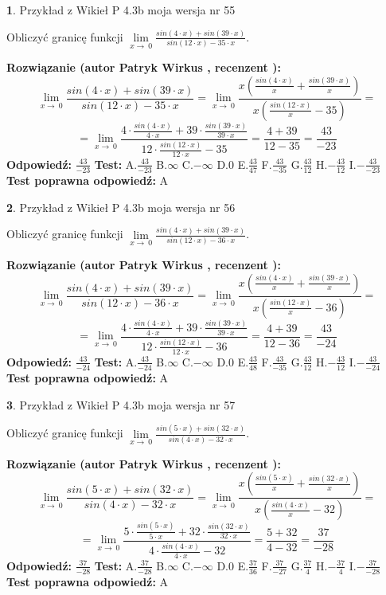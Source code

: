 \documentclass[12pt, a4paper]{article}
\theoremstyle{definition} %
\newtheorem{zad}{}
\newcommand{\zadStart}[1]{\begin{zad}#1\newline}
\newcommand{\zadStop}{\end{zad}}
\newcommand{\rozwStart}[2]{\noindent \textbf{Rozwiązanie (autor #1 , recenzent #2): }\newline}
\newcommand{\rozwStop}{\newline}
\newcommand{\odpStart}{\noindent \textbf{Odpowiedź:}\newline}
\newcommand{\odpStop}{\newline}
\newcommand{\testStart}{\noindent \textbf{Test:}\newline}
\newcommand{\testStop}{\newline}
\newcommand{\kluczStart}{\noindent \textbf{Test poprawna odpowiedź:}\newline}
\newcommand{\kluczStop}{\newline}
\begin{document}
\zadStart{Przykład z Wikieł P 4.3b moja wersja nr 55}


Obliczyć granicę funkcji $\lim\limits_{x\to\ 0}\frac{sin(4 \cdot x)+sin(39 \cdot x)}{sin(12 \cdot x)-35 \cdot x}$.
\zadStop
\rozwStart{Patryk Wirkus}{}
$$\lim\limits_{x\to\ 0}\frac{sin(4 \cdot x)+sin(39 \cdot x)}{sin(12 \cdot x)-35 \cdot x}=\lim\limits_{x\to\ 0}\frac{x(\frac{sin(4 \cdot x)}{x}+\frac{sin(39 \cdot x)}{x})}{x(\frac{sin(12 \cdot x)}{x}-35)}=$$
$$=\lim\limits_{x\to\ 0}\frac{4 \cdot \frac{sin(4 \cdot x)}{4 \cdot x}+39 \cdot \frac{sin(39 \cdot x)}{39 \cdot x}}{12 \cdot \frac{sin(12 \cdot x)}{12 \cdot x}-35}=\frac{4+39}{12-35} = \frac{43}{-23}$$
\rozwStop
\odpStart
$\frac{43}{-23}$
\odpStop
\testStart
A.$\frac{43}{-23}$
B.$\infty$
C.$-\infty$
D.$0$
E.$\frac{43}{47}$
F.$\frac{43}{-35}$
G.$\frac{43}{12}$
H.$-\frac{43}{12}$
I.$-\frac{43}{-23}$
\testStop
\kluczStart
A
\kluczStop



\zadStart{Przykład z Wikieł P 4.3b moja wersja nr 56}


Obliczyć granicę funkcji $\lim\limits_{x\to\ 0}\frac{sin(4 \cdot x)+sin(39 \cdot x)}{sin(12 \cdot x)-36 \cdot x}$.
\zadStop
\rozwStart{Patryk Wirkus}{}
$$\lim\limits_{x\to\ 0}\frac{sin(4 \cdot x)+sin(39 \cdot x)}{sin(12 \cdot x)-36 \cdot x}=\lim\limits_{x\to\ 0}\frac{x(\frac{sin(4 \cdot x)}{x}+\frac{sin(39 \cdot x)}{x})}{x(\frac{sin(12 \cdot x)}{x}-36)}=$$
$$=\lim\limits_{x\to\ 0}\frac{4 \cdot \frac{sin(4 \cdot x)}{4 \cdot x}+39 \cdot \frac{sin(39 \cdot x)}{39 \cdot x}}{12 \cdot \frac{sin(12 \cdot x)}{12 \cdot x}-36}=\frac{4+39}{12-36} = \frac{43}{-24}$$
\rozwStop
\odpStart
$\frac{43}{-24}$
\odpStop
\testStart
A.$\frac{43}{-24}$
B.$\infty$
C.$-\infty$
D.$0$
E.$\frac{43}{48}$
F.$\frac{43}{-35}$
G.$\frac{43}{12}$
H.$-\frac{43}{12}$
I.$-\frac{43}{-24}$
\testStop
\kluczStart
A
\kluczStop



\zadStart{Przykład z Wikieł P 4.3b moja wersja nr 57}


Obliczyć granicę funkcji $\lim\limits_{x\to\ 0}\frac{sin(5 \cdot x)+sin(32 \cdot x)}{sin(4 \cdot x)-32 \cdot x}$.
\zadStop
\rozwStart{Patryk Wirkus}{}
$$\lim\limits_{x\to\ 0}\frac{sin(5 \cdot x)+sin(32 \cdot x)}{sin(4 \cdot x)-32 \cdot x}=\lim\limits_{x\to\ 0}\frac{x(\frac{sin(5 \cdot x)}{x}+\frac{sin(32 \cdot x)}{x})}{x(\frac{sin(4 \cdot x)}{x}-32)}=$$
$$=\lim\limits_{x\to\ 0}\frac{5 \cdot \frac{sin(5 \cdot x)}{5 \cdot x}+32 \cdot \frac{sin(32 \cdot x)}{32 \cdot x}}{4 \cdot \frac{sin(4 \cdot x)}{4 \cdot x}-32}=\frac{5+32}{4-32} = \frac{37}{-28}$$
\rozwStop
\odpStart
$\frac{37}{-28}$
\odpStop
\testStart
A.$\frac{37}{-28}$
B.$\infty$
C.$-\infty$
D.$0$
E.$\frac{37}{36}$
F.$\frac{37}{-27}$
G.$\frac{37}{4}$
H.$-\frac{37}{4}$
I.$-\frac{37}{-28}$
\testStop
\kluczStart
A
\kluczStop
\end{document}
